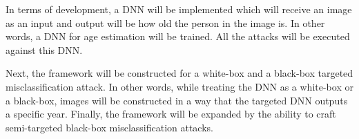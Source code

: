 In terms of development, a DNN will be implemented which will receive an image as an input and output will be how old the person in the image is. In other words, a DNN for age estimation will be trained. All the attacks will be executed against this DNN. 

Next, the framework will be constructed for a white-box and a black-box targeted misclassification attack. In other words, while treating the DNN as a white-box or a black-box, images will be constructed in a way that the targeted DNN outputs a specific year. Finally, the framework will be expanded by the ability to craft semi-targeted black-box misclassification attacks.